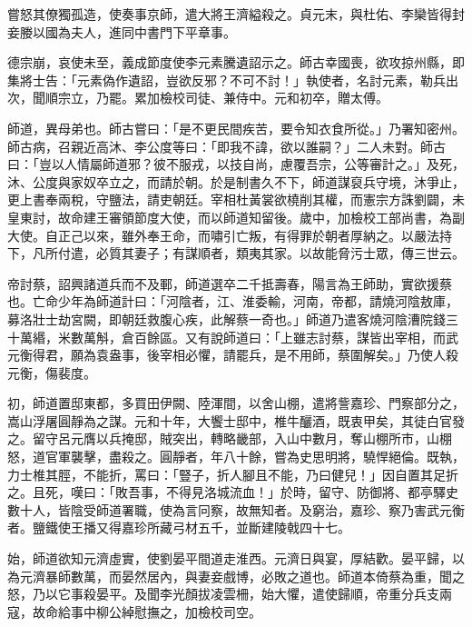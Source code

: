 \begin{pinyinscope}
 嘗怒其僚獨孤造，使奏事京師，遣大將王濟縊殺之。貞元末，與杜佑、李欒皆得封妾媵以國為夫人，進同中書門下平章事。



 德宗崩，哀使未至，義成節度使李元素騰遺詔示之。師古幸國喪，欲攻掠州縣，即集將士告：「元素偽作遺詔，豈欲反邪？不可不討！」執使者，名討元素，勒兵出次，聞順宗立，乃罷。累加檢校司徒、兼侍中。元和初卒，贈太傅。



 師道，異母弟也。師古嘗曰：「是不更民間疾苦，要令知衣食所從。」乃署知密州。師古病，召親近高沐、李公度等曰：「即我不諱，欲以誰嗣？」二人未對。師古曰：「豈以人情屬師道邪？彼不服戎，以技自尚，慮覆吾宗，公等審計之。」及死，沐、公度與家奴卒立之，而請於朝。於是制書久不下，師道謀裒兵守境，沐爭止，更上書奉兩稅，守鹽法，請吏朝廷。宰相杜黃裳欲橈削其權，而憲宗方誅劉闢，未皇東討，故命建王審領節度大使，而以師道知留後。歲中，加檢校工部尚書，為副大使。自正己以來，雖外奉王命，而嘯引亡叛，有得罪於朝者厚納之。以嚴法持下，凡所付遣，必質其妻子；有謀順者，類夷其家。以故能脅污士眾，傳三世云。



 帝討蔡，詔興諸道兵而不及鄆，師道選卒二千抵壽春，陽言為王師助，實欲援蔡也。亡命少年為師道計曰：「河陰者，江、淮委輸，河南，帝都，請燒河陰敖庫，募洛壯士劫宮闕，即朝廷救腹心疾，此解蔡一奇也。」師道乃遣客燒河陰漕院錢三十萬緡，米數萬斛，倉百餘區。又有說師道曰：「上雖志討蔡，謀皆出宰相，而武元衡得君，願為袁盎事，後宰相必懼，請罷兵，是不用師，蔡圍解矣。」乃使人殺元衡，傷裴度。



 初，師道置邸東都，多買田伊闕、陸渾間，以舍山棚，遣將訾嘉珍、門察部分之，嵩山浮屠圓靜為之謀。元和十年，大饗士邸中，椎牛釃酒，既衷甲矣，其徒白官發之。留守呂元膺以兵掩邸，賊突出，轉略畿部，入山中數月，奪山棚所市，山棚怒，道官軍襲擊，盡殺之。圓靜者，年八十餘，嘗為史思明將，驍悍絕倫。既執，力士椎其脛，不能折，罵曰：「豎子，折人腳且不能，乃曰健兒！」因自置其足折之。且死，嘆曰：「敗吾事，不得見洛城流血！」於時，留守、防御將、都亭驛史數十人，皆陰受師道署職，使為言冋察，故無知者。及窮治，嘉珍、察乃害武元衡者。鹽鐵使王播又得嘉珍所藏弓材五千，並斷建陵戟四十七。



 始，師道欲知元濟虛實，使劉晏平間道走淮西。元濟日與宴，厚結歡。晏平歸，以為元濟暴師數萬，而晏然居內，與妻妾戲博，必敗之道也。師道本倚蔡為重，聞之怒，乃以它事殺晏平。及聞李光顏拔凌雲柵，始大懼，遣使歸順，帝重分兵支兩寇，故命給事中柳公綽慰撫之，加檢校司空。




\end{pinyinscope}
